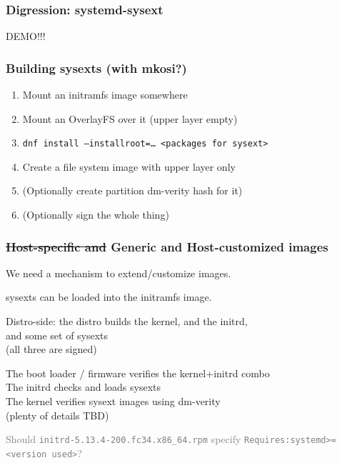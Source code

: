 \documentclass[]{beamer}
\begin{document}
\begin{frame}
  \frametitle{Digression: systemd-sysext}

  DEMO!!!

\end{frame}

\begin{frame}
  \frametitle{Building sysexts (with mkosi?)}

  \begin{enumerate}
  \item Mount an initramfs image somewhere
  \item Mount an OverlayFS over it (upper layer empty)
  \item \texttt{dnf install --installroot=… <packages for sysext>}
  \item Create a file system image with upper layer only
  \item (Optionally create partition dm-verity hash for it)
  \item (Optionally sign the whole thing)
  \end{enumerate}
\end{frame}

\begin{frame}
  \frametitle{\sout{Host-specific and }Generic and Host-customized images}

  We need a mechanism to extend/customize images.

  \bigskip
  \pause

  sysexts can be loaded into the initramfs image.

  \bigskip
  \pause

  Distro-side: the distro builds the kernel, and the initrd,\\
  \phantom{Distro-side: }and some set of sysexts\\
  \phantom{Distro-side: }(all three are signed)\\

  \pause

  The boot loader / firmware verifies the kernel+initrd combo\\
  The initrd checks and loads sysexts\\
  The kernel verifies sysext images using dm-verity\\
  (plenty of details TBD)

  \vfill

  \textcolor{gray}{Should \texttt{initrd-5.13.4-200.fc34.x86\_64.rpm} specify \texttt{Requires:systemd>=<version used>}?}
\end{frame}
\end{document}
